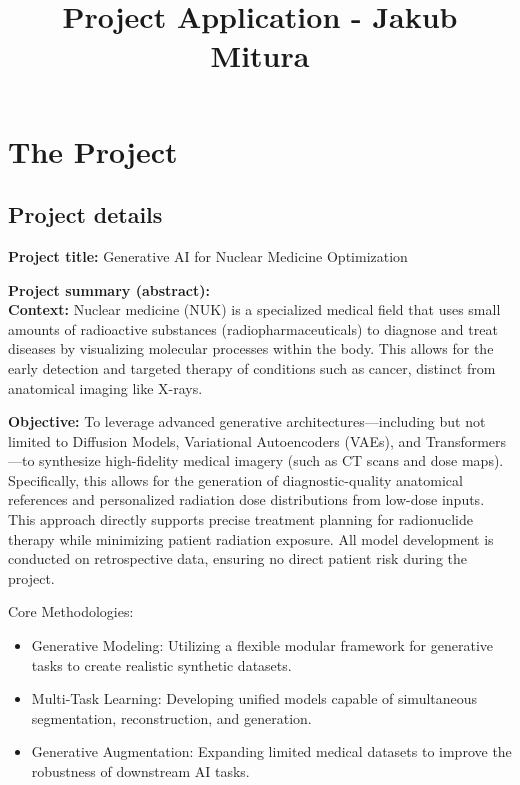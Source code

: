 \documentclass[12pt,a4paper]{article}
\title{\textbf{Project Application - Jakub Mitura}}
\author{}
\date{}
\begin{document}
\maketitle
\thispagestyle{fancy}

\section*{The Project}

\subsection*{Project details}

\textbf{Project title:} Generative AI for Nuclear Medicine Optimization

\textbf{Project summary (abstract):} \\
\textbf{Context:} Nuclear medicine (NUK) is a specialized medical field that uses small amounts of radioactive substances (radiopharmaceuticals) to diagnose and treat diseases by visualizing molecular processes within the body. This allows for the early detection and targeted therapy of conditions such as cancer, distinct from anatomical imaging like X-rays.

\textbf{Objective:} To leverage advanced generative architectures—including but not limited to Diffusion Models, Variational Autoencoders (VAEs), and Transformers—to synthesize high-fidelity medical imagery (such as CT scans and dose maps). Specifically, this allows for the generation of diagnostic-quality anatomical references and personalized radiation dose distributions from low-dose inputs. This approach directly supports precise treatment planning for radionuclide therapy while minimizing patient radiation exposure. All model development is conducted on retrospective data, ensuring no direct patient risk during the project.

Core Methodologies:
\begin{itemize}
    \item Generative Modeling: Utilizing a flexible modular framework for generative tasks to create realistic synthetic datasets.
    \item Multi-Task Learning: Developing unified models capable of simultaneous segmentation, reconstruction, and generation.
    \item Generative Augmentation: Expanding limited medical datasets to improve the robustness of downstream AI tasks.
\end{itemize}
\end{document}
